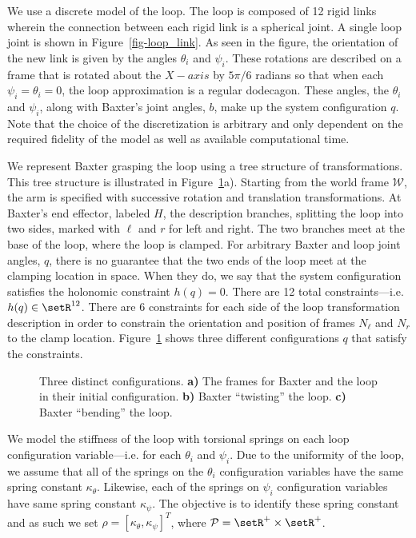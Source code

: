 \documentclass[letterpaper, 10pt, conference]{ieeeconf}
\begin{document}
We use a discrete model of the loop.  The loop is composed of 12 rigid links wherein the connection between each rigid link is a spherical joint.  A single loop joint is shown in Figure~\ref{fig-loop_link}.  As seen in the figure, the orientation of the new link is given by the angles $\theta_i$ and $\psi_i$.  These rotations are described on a frame that is rotated about the $X-axis$ by $5\pi/6$ radians so that when each $\psi_i = \theta_i = 0$, the loop approximation is a regular dodecagon.  These angles, the $\theta_i$ and $\psi_i$, along with Baxter's joint angles, $b$, make up the system configuration $q$. Note that the choice of the discretization is arbitrary and only dependent on the required fidelity of the model as well as available computational time. 

We represent Baxter grasping the loop using a tree structure of transformations.  This tree structure is illustrated in Figure~\ref{fig-3bloops}a).  Starting from the world frame $\mathcal{W}$, the arm is specified with successive rotation and translation transformations.  At Baxter's end effector, labeled $H$, the description branches, splitting the loop into two sides, marked with $\ell$ and $r$ for left and right.  The two branches meet at the base of the loop, where the loop is clamped.  For arbitrary Baxter and loop joint angles, $q$, there is no guarantee that the two ends of the loop meet at the clamping location in space.  When they do, we say that the system configuration satisfies the holonomic constraint $h(q) = 0$.  There are 12 total constraints---i.e. $h(q)\in\setR^{12}$.  There are 6 constraints for each side of the loop transformation description in order to constrain the orientation and position of frames $N_\ell$ and $N_r$ to the clamp location.  Figure~\ref{fig-3bloops} shows three different configurations $q$ that satisfy the constraints.

\begin{figure}
\centering
\def\svgwidth{.97\textwidth}

\caption{Three distinct configurations.  \textbf{a)} The frames for Baxter and the loop in their initial configuration. \textbf{b)} Baxter ``twisting'' the loop. \textbf{c)} Baxter ``bending'' the loop.}
\label{fig-3bloops}
\end{figure}

We model the stiffness of the loop with torsional springs on each loop configuration variable---i.e. for each $\theta_i$ and $\psi_i$.  Due to the uniformity of the loop, we assume that all of the springs on the $\theta_i$ configuration variables have the same spring constant $\kappa_{\theta}$.  Likewise, each of the springs on $\psi_i$ configuration variables have same spring constant $\kappa_{\psi}$.  The objective is to identify these spring constant and as such we set $\rho = [\kappa_{\theta}, \kappa_{\psi}]^T$, where $\mathcal{P} = \setR^+ \times \setR^+$.  
\end{document}
